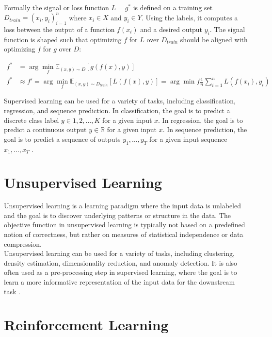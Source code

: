 Formally the signal or loss function $L = g^*$ is defined on a training set $D_{train} = {(x_i,y_i)}_{i=1}^n$ where $x_i \in X$ and $y_i \in Y$. Using the 
labels, it computes a loss between the output of a function $f(x_i)$ and a desired output $y_i$. The signal function is shaped such that optimizing $f$ for $L$ 
over $D_{train}$ should be aligned with optimizing $f$ for $g$ over $D$:

\begin{equation}
\begin{aligned}
f^* &= \arg\min_{f} \mathbb{E}_{(x,y) \sim D}[g(f(x), y)] \\
f^* &\approx f' = \arg\min_{f} \mathbb{E}_{(x,y) \sim D_{train}}[L(f(x),y)] = \arg\min{f} \frac{1}{n}\sum_{i=1}^n L(f(x_i),y_i)
\end{aligned}
\end{equation}


Supervised learning can be used for a variety of tasks, including classification, regression, and sequence prediction. In classification, 
the goal is to predict a discrete class label $y \in {1,2,\ldots,K}$ for a given input $x$. In regression, the goal is to predict a continuous 
output $y \in \mathbb{R}$ for a given input $x$. In sequence prediction, the goal is to predict a sequence of outputs $y_1,\ldots,y_T$ for a 
given input sequence $x_1,\ldots,x_T$ \cite[chapter~4]{bishop} \cite[chapter~5, chapter~6]{Goodfellow}.

\section{Unsupervised Learning}
\label{section:unsup_learn}
Unsupervised learning is a learning paradigm where the input data is unlabeled and the goal is to discover underlying patterns or structure in the data.
The objective function in unsupervised learning is typically not based on a predefined notion of correctness, but rather on measures of statistical
independence or data compression.\\

Unsupervised learning can be used for a variety of tasks, including clustering, density estimation, dimensionality reduction, and anomaly detection.
It is also often used as a pre-processing step in supervised learning, where the goal is to learn a more informative representation of the input data 
for the downstream task \cite[chapter~9]{bishop} \cite[chapter~5]{Goodfellow}. 

\section{Reinforcement Learning}
\label{section:rl}

